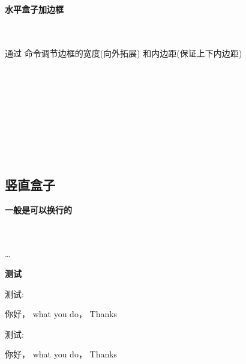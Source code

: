\documentclass[fontset=windows]{article}
\begin{document}
\textbf{水平盒子加边框}

\begin{command}
    \marg*{\ldots} \\
    \marg*{\ldots}\\
    \marg*{\ldots}
    通过  命令调节边框的宽度(向外拓展)  和内边距(保证上下内边距)  
\end{command}


\begin{example}
    \\
    \\
    \\
    \\
    \\
    \\


    \setlength{\fboxrule}{5mm}
    \\

    \setlength{\fboxsep}{10mm}  

\end{example}

\subsection{竖直盒子}
\textbf{一般是可以换行的}\par
\begin{command}
    \marg*{\ldots} \\[0.5ex]
     \\
    \ldots \\
\end{command}

\textbf{测试}\par
\begin{example}
测试:\parbox[b][2em][r]{3em}%
    {你好， what you do， Thanks}    
\end{example}


\vspace*{4em}
\begin{example}
测试:\parbox[b][2em][r]{3em}%
    {你好， what you do， Thanks}    
\end{example}
\end{document}

